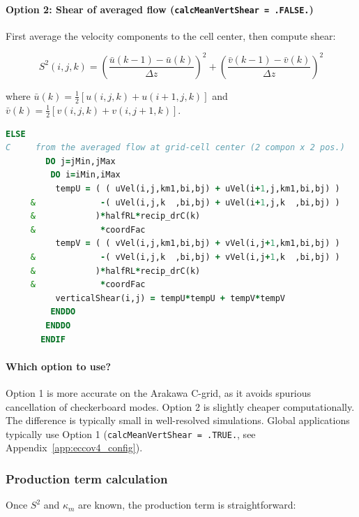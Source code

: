 \documentclass[12pt,letterpaper]{article}
\begin{document}
\paragraph{Option 2: Shear of averaged flow (\texttt{calcMeanVertShear = .FALSE.})}

First average the velocity components to the cell center, then compute shear:

\begin{equation}
S^2(i,j,k) = \left(\frac{\bar{u}(k-1) - \bar{u}(k)}{\Delta z}\right)^2
+ \left(\frac{\bar{v}(k-1) - \bar{v}(k)}{\Delta z}\right)^2
\label{eq:shear_option2}
\end{equation}

where $\bar{u}(k) = \frac{1}{2}[u(i,j,k) + u(i+1,j,k)]$ and $\bar{v}(k) = \frac{1}{2}[v(i,j,k) + v(i,j+1,k)]$.

\begin{lstlisting}[language=Fortran,caption={(ggl90\_calc.F:L483--498) Vertical shear: Option 2}]
       ELSE
C     from the averaged flow at grid-cell center (2 compon x 2 pos.)
        DO j=jMin,jMax
         DO i=iMin,iMax
          tempU = ( ( uVel(i,j,km1,bi,bj) + uVel(i+1,j,km1,bi,bj) )
     &             -( uVel(i,j,k  ,bi,bj) + uVel(i+1,j,k  ,bi,bj) )
     &            )*halfRL*recip_drC(k)
     &             *coordFac
          tempV = ( ( vVel(i,j,km1,bi,bj) + vVel(i,j+1,km1,bi,bj) )
     &             -( vVel(i,j,k  ,bi,bj) + vVel(i,j+1,k  ,bi,bj) )
     &            )*halfRL*recip_drC(k)
     &             *coordFac
          verticalShear(i,j) = tempU*tempU + tempV*tempV
         ENDDO
        ENDDO
       ENDIF
\end{lstlisting}

\paragraph{Which option to use?} Option 1 is more accurate on the Arakawa C-grid, as it avoids spurious cancellation of checkerboard modes. Option 2 is slightly cheaper computationally. The difference is typically small in well-resolved simulations. Global applications typically use Option 1 (\verb|calcMeanVertShear = .TRUE.|, see Appendix~\ref{app:eccov4_config}).

\subsubsection{Production term calculation}

Once $S^2$ and $\kappa_m$ are known, the production term is straightforward:
\end{document}
